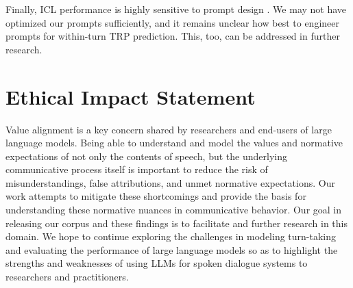 Finally, ICL performance is highly sensitive to prompt design \cite{wei2023larger}. We may not have optimized our prompts sufficiently, and it remains unclear how best to engineer prompts for within-turn TRP prediction. This, too, can be addressed in further research.

\section{Ethical Impact Statement}

Value alignment is a key concern shared by researchers and end-users of large language models. Being able to understand and model the values and normative expectations of not only the contents of speech, but the underlying communicative process itself is important to reduce the risk of misunderstandings, false attributions, and unmet normative expectations. Our work attempts to mitigate these shortcomings and provide the basis for understanding these normative nuances in communicative behavior. Our goal in releasing our corpus and these findings is to facilitate and further research in this domain. We hope to continue exploring the challenges in modeling turn-taking and evaluating the performance of large language models so as to highlight the strengths and weaknesses of using LLMs for spoken dialogue systems to researchers and practitioners.


% 